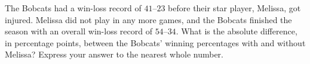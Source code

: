 The Bobcats had a win-loss record of $41$--$23$ before their star player, Melissa, got injured. Melissa did not play in any more games, and the Bobcats finished the season with an overall win-loss record of $54$--$34$. What is the absolute difference, in percentage points, between the Bobcats' winning percentages with and without Melissa? Express your answer to the nearest whole number.
